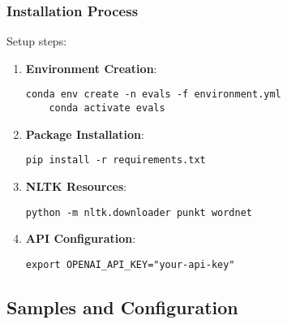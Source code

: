\subsubsection{Installation Process}
Setup steps:
\begin{enumerate}
    \item \textbf{Environment Creation}:
    \begin{lstlisting}[basicstyle=\ttfamily\small]
    conda env create -n evals -f environment.yml
    conda activate evals
    \end{lstlisting}

    \item \textbf{Package Installation}:
    \begin{lstlisting}[basicstyle=\ttfamily\small]
    pip install -r requirements.txt
    \end{lstlisting}

    \item \textbf{NLTK Resources}:
    \begin{lstlisting}[basicstyle=\ttfamily\small]
    python -m nltk.downloader punkt wordnet
    \end{lstlisting}

    \item \textbf{API Configuration}:
    \begin{lstlisting}[basicstyle=\ttfamily\small]
    export OPENAI_API_KEY="your-api-key"
    \end{lstlisting}
\end{enumerate}

\subsection{Samples and Configuration}

